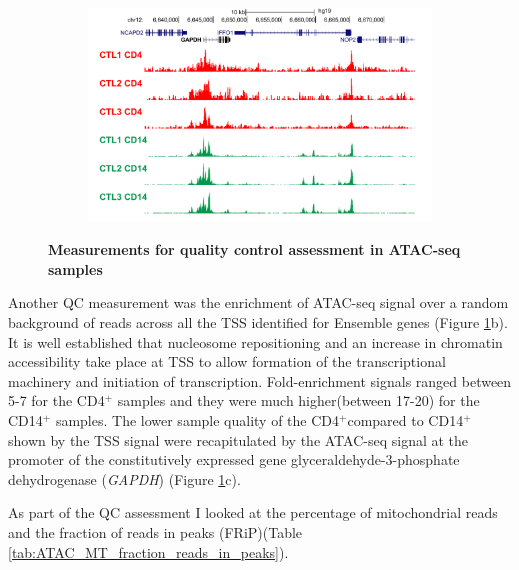\begin{figure}[htbp]
\begin{subfigure}[b]{0.6\textwidth}
\centering
\includegraphics[width=\textwidth]{./Results1/pdfs/ATAC_Core_CD4_CD14_fresh_GAPDH}
\caption{\textbf{}} %
\end{subfigure}
\caption[Measurements for quality control assessment in ATAC-seq samples]{\textbf{Measurements for quality control assessment in ATAC-seq samples}}
\label{fig:QC_ATAC}
\end{figure} 



Another QC measurement was the enrichment of ATAC-seq signal over a random background of reads across all the TSS identified for Ensemble genes (Figure \ref{fig:QC_ATAC}b). It is well established that nucleosome repositioning and an increase in chromatin accessibility take place at TSS to allow formation of the transcriptional machinery and initiation of transcription. Fold-enrichment signals ranged between 5-7 for the CD4$^+$ samples and they were much higher(between 17-20) for the CD14$^+$ samples. The lower sample quality of the CD4$^+$compared to CD14$^+$ shown by the TSS signal were recapitulated by the ATAC-seq signal at the promoter of the constitutively expressed gene glyceraldehyde-3-phosphate dehydrogenase (\textit{GAPDH}) (Figure \ref{fig:QC_ATAC}c). 
	
As part of the QC assessment I looked at the percentage of mitochondrial reads and the fraction of reads in peaks (FRiP)(Table \ref{tab:ATAC_MT_fraction_reads_in_peaks}). 

